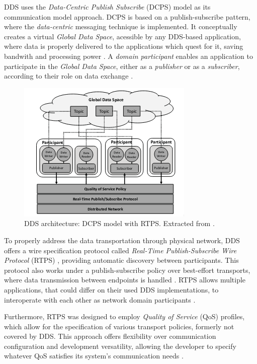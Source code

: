 DDS uses the \textit{Data-Centric Publish Subscribe} (DCPS) model as its communication model approach. DCPS is based on a publish-subscribe pattern, where the \textit{data-centric} messaging technique is implemented. It conceptually creates a virtual \textit{Global Data Space}, acessible by any DDS-based application, where data is properly delivered to the applications which quest for it, saving bandwith and processing power \cite{3, pardo2005introduction}. A \textit{domain participant} enables an application to participate in the \textit{Global Data Space}, either as a \textit{publisher} or as a \textit{subscriber}, according to their role on data exchange \cite{maruyama2016exploring, alaerjan2017modeling, dcps-rtps}. 

\begin{figure}[H]
    \centering
    \includegraphics[width=0.4\linewidth]{img/dcps-model.png}
    \caption{DDS architecture: DCPS model with RTPS. Extracted from \cite{maruyama2016exploring}.}
    \label{fig:dcps-model}
\end{figure}

To properly address the data transportation through physical network, DDS offers a wire specification protocol called \textit{Real-Time Publish-Subscribe Wire Protocol} (RTPS) \cite{rtps}, providing automatic discovery between participants. This protocol also works under a publish-subscribe policy over best-effort transports, where data transmission between endpoints is handled \cite{yun2017data}. RTPS allows multiple applications, that could differ on their used DDS implementations, to interoperate with each other as network domain participants \cite{dcps-rtps, alaerjan2017modeling}.

Furthermore, RTPS was designed to employ \textit{Quality of Service} (QoS) profiles, which allow for the specification of various transport policies, formerly not covered by DDS. This approach offers flexibility over communication configuration and development versatility, allowing the developer to specify whatever QoS satisfies its system's communication needs \cite{alaerjan2017modeling, diluoffo2018robot, maruyama2016exploring}. 


